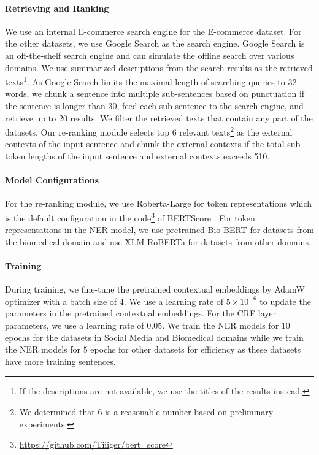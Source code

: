 \documentclass[11pt,a4paper]{article}
\begin{document}
\paragraph{Retrieving and Ranking} We use an internal E-commerce search engine for the E-commerce dataset. For the other datasets, we use Google Search as the search engine. Google Search is an off-the-shelf search engine and can simulate the offline search over various domains.
We use summarized descriptions from the search results as the retrieved texts\footnote{If the descriptions are not available, we use the titles of the results instead.}. As Google Search limits the maximal length of searching queries to 32 words, we chunk a sentence into multiple sub-sentences based on punctuation if the sentence is longer than 30, feed each sub-sentence to the search engine, and retrieve up to 20 results. We filter the retrieved texts that contain any part of the datasets. Our re-ranking module selects top $6$ relevant texts\footnote{We determined that $6$ is a reasonable number based on preliminary experiments.} as the external contexts of the input sentence and chunk the external contexts if the total sub-token lengths of the input sentence and external contexts exceeds 510.

\paragraph{Model Configurations}
For the re-ranking module, we use Roberta-Large \citep{liu2019roberta} for token representations which is the default configuration in the code\footnote{\url{https://github.com/Tiiiger/bert_score}} of BERTScore \citep{Zhang*2020BERTScore:}. For token representations in the NER model, we use pretrained Bio-BERT \citep{lee2020biobert} for datasets from the biomedical domain and use XLM-RoBERTa \citep{conneau-etal-2020-unsupervised} for datasets from other domains. %

\paragraph{Training} 
During training, we fine-tune the pretrained contextual embeddings by AdamW \citep{loshchilov2018decoupled} optimizer with a batch size of $4$. We use a learning rate of $5\times 10^{-6}$ to update the parameters in the pretrained contextual embeddings. For the CRF layer parameters, we use a learning rate of $0.05$. We train the NER models for $10$ epochs for the datasets in Social Media and Biomedical domains while we train the NER models for $5$ epochs for other datasets for efficiency as these datasets have more training sentences.
\end{document}
